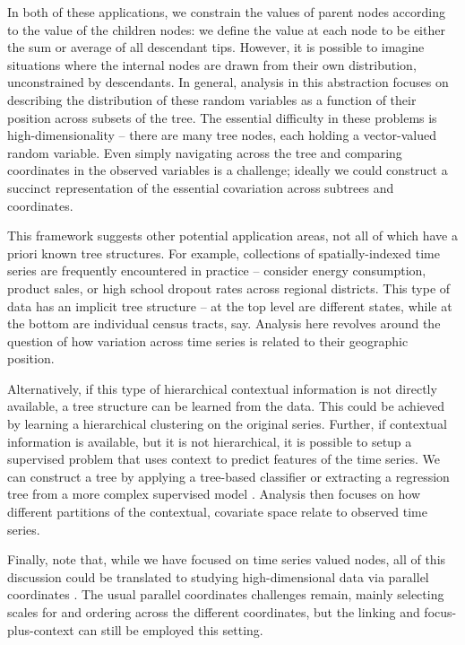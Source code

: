 \documentclass[12pt]{article}
\begin{document}
In both of these applications, we constrain the values of parent nodes according
to the value of the children nodes: we define the value at each node to be
either the sum or average of all descendant tips. However, it is possible to
imagine situations where the internal nodes are drawn from their own
distribution, unconstrained by descendants. In general, analysis in this
abstraction focuses on describing the distribution of these random variables as
a function of their position across subsets of the tree. The essential
difficulty in these problems is high-dimensionality -- there are many tree
nodes, each holding a vector-valued random variable. Even simply navigating
across the tree and comparing coordinates in the observed variables is a
challenge; ideally we could construct a succinct representation of the essential
covariation across subtrees and coordinates.

This framework suggests other potential application areas, not all of which have
a priori known tree structures. For example, collections of spatially-indexed
time series are frequently encountered in practice -- consider energy
consumption, product sales, or high school dropout rates across regional
districts. This type of data has an implicit tree structure -- at the top level
are different states, while at the bottom are individual census tracts, say.
Analysis here revolves around the question of how variation across time series
is related to their geographic position.

Alternatively, if this type of hierarchical contextual information is not
directly available, a tree structure can be learned from the data. This could be
achieved by learning a hierarchical clustering on the original series. Further,
if contextual information is available, but it is not hierarchical, it is
possible to setup a supervised problem that uses context to predict features of
the time series. We can construct a tree by applying a tree-based classifier
\citep{breiman1984classification} or extracting a regression tree from a more
complex supervised model \citep{boz2002extracting,saito2002extracting}. Analysis
then focuses on how different partitions of the contextual, covariate space
relate to observed time series.

Finally, note that, while we have focused on time series valued nodes,
all of this discussion could be translated to studying high-dimensional
data via parallel coordinates \citep{inselberg1991parallel}. The usual parallel
coordinates challenges remain, mainly selecting scales for and ordering
across the different coordinates, but the linking and focus-plus-context
can still be employed this setting.
\end{document}
